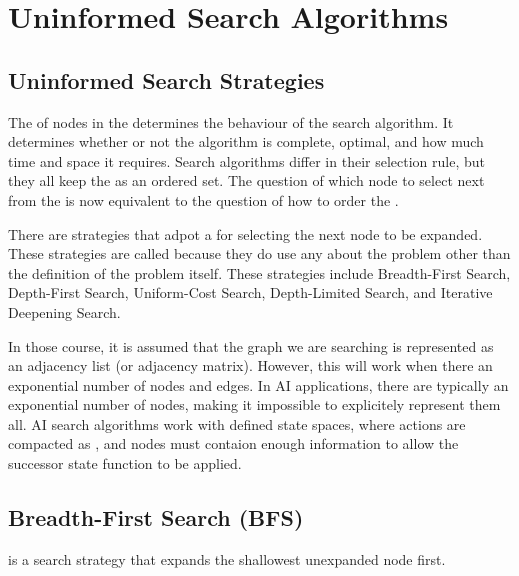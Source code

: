 \section{Uninformed Search Algorithms}

\subsection{Uninformed Search Strategies}

The  of nodes in the \Frontier determines the behaviour of the search algorithm. It determines whether or not the algorithm is complete, optimal, and how much time and space it requires. Search algorithms differ in their selection rule, but they all keep the \Frontier as an ordered set. The question of which node to select next from the \Frontier is now equivalent to the question of how to order the \Frontier.

There are strategies that adpot a  for selecting the next node to be expanded. These strategies are called  because they do  use any  about the problem other than the definition of the problem itself. These strategies include Breadth-First Search, Depth-First Search, Uniform-Cost Search, Depth-Limited Search, and Iterative Deepening Search.

In those course, it is assumed that the graph we are searching is  represented as an adjacency list (or adjacency matrix). However, this will  work when there an exponential number of nodes and edges. In AI applications, there are typically an exponential number of nodes, making it impossible to explicitely represent them all. AI search algorithms work with  defined state spaces, where actions are compacted as , and nodes must contaion enough information to allow the successor state function to be applied.

\subsection{Breadth-First Search (BFS)}

\begin{definition}\label{def:bfs}
     is a search strategy that expands the shallowest unexpanded node first.
\end{definition}

